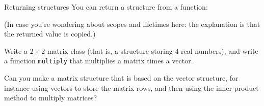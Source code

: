 \begin{block}{Returning structures}
  \label{sl:struct-return}
  You can return a structure from a function:

  (In case you're wondering about scopes and lifetimes here: the
  explanation is that the returned value is copied.)
\end{block}

\begin{exercise}
  \label{ex:matstruct}
  Write a $2\times 2$ matrix class (that is, a structure storing 4
  real numbers), and write a function \lstinline$multiply$
  that multiplies a matrix times a vector.

  Can you make a matrix structure that is based on the vector
  structure, for instance using vectors to store the matrix rows, and
  then using the inner product method to multiply matrices?
\end{exercise}

\endinput

\begin{block}{Passing structures by reference}
  \label{sl:struct-passref}
  Prevent copying cost by passing by reference, use \lstinline$const$ to
  prevent changes:
  \verbatimsnippet{structpassref}
\end{block}
